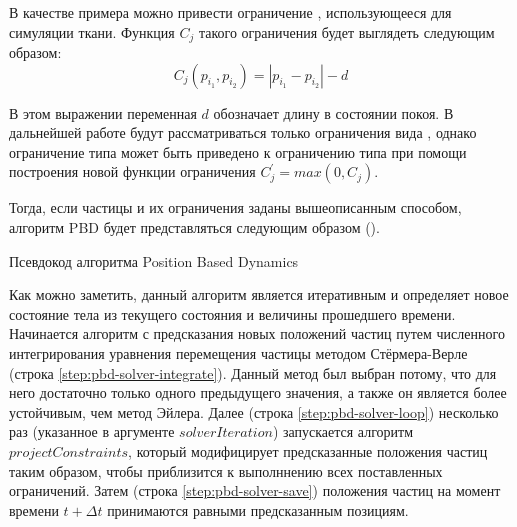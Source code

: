 	В качестве примера можно привести ограничение , использующееся для симуляции ткани. Функция $C_j$ такого ограничения будет выглядеть следующим образом:
	\begin{equation} \label{eq:constraint-spring}
		C_j(p_{i_1}, p_{i_2}) = |p_{i_1} - p_{i_2}| - d
	\end{equation} 
	
	В этом выражении переменная $d$ обозначает длину  в состоянии покоя. В дальнейшей работе будут рассматриваться только ограничения вида , однако ограничение типа  может быть приведено к ограничению типа  при помощи построения новой функции ограничения $C^{'}_{j} = max(0, C_j)$.
	
	Тогда, если частицы и их ограничения заданы вышеописанным способом, алгоритм PBD будет представляться следующим образом ().
	
	\begin{algorithm} %
		\nonl{}		
		\caption{Псевдокод алгоритма Position Based Dynamics}\label{alg:PositionBasedDynamics}
	\end{algorithm}
	\FloatBarrier
	
	Как можно заметить, данный алгоритм является итеративным и определяет новое состояние тела из текущего состояния и величины прошедшего времени. Начинается алгоритм с предсказания новых положений частиц путем численного интегрирования уравнения перемещения частицы методом Стёрмера-Верле\cite{verlet1967computer} (строка \ref{step:pbd-solver-integrate}). Данный метод был выбран потому, что для него достаточно только одного предыдущего значения, а также он является более устойчивым, чем метод Эйлера. Далее (строка \ref{step:pbd-solver-loop}) несколько раз (указанное в аргументе $solverIteration$) запускается алгоритм $projectConstraints$, который модифицирует предсказанные положения частиц таким образом, чтобы приблизится к выполннению всех поставленных ограничений. Затем (строка \ref{step:pbd-solver-save}) положения частиц на момент времени $t + \Delta t$ принимаются равными предсказанным позициям.
	
